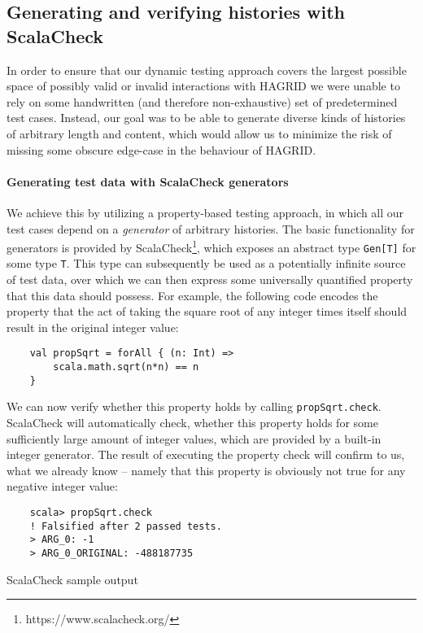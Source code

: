 \subsection{Generating and verifying histories with ScalaCheck}
\label{sec:test_approach}
In order to ensure that our dynamic testing approach covers the largest possible space of possibly valid or invalid interactions with HAGRID we were unable to rely on some handwritten (and therefore non-exhaustive) set of predetermined test cases. Instead, our goal was to be able to generate diverse kinds of histories of arbitrary length and content, which would allow us to minimize the risk of missing some obscure edge-case in the behaviour of HAGRID.

\paragraph{Generating test data with ScalaCheck generators}
We achieve this by utilizing a property-based testing approach, in which all our test cases depend on a \emph{generator} of arbitrary histories. The basic functionality for generators is provided by ScalaCheck\footnote{https://www.scalacheck.org/}, which exposes an abstract type \texttt{Gen[T]} for some type \texttt{T}. This type can subsequently be used as a potentially infinite source of test data, over which we can then express some universally quantified property that this data should possess.
For example, the following code encodes the property that the act of taking the square root of any integer times itself should result in the original integer value: 
\begin{verbatim}
    val propSqrt = forAll { (n: Int) => 
        scala.math.sqrt(n*n) == n 
    }
\end{verbatim}

We can now verify whether this property holds by calling \texttt{propSqrt.check}. 
ScalaCheck will automatically check, whether this property holds for some sufficiently large amount of integer values, which are provided by a built-in integer generator. The result of executing the property check will confirm to us, what we already know -- namely that this property is obviously not true for any negative integer value: 
\begin{code}
    \begin{verbatim}
    scala> propSqrt.check
    ! Falsified after 2 passed tests.
    > ARG_0: -1
    > ARG_0_ORIGINAL: -488187735
    \end{verbatim} 
    \caption{ScalaCheck sample output}
\end{code}

